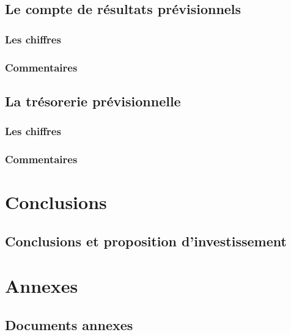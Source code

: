 \documentclass[a4paper]{report}
\begin{document}
\section{Le compte de résultats prévisionnels}

\subsection{Les chiffres}

\subsection{Commentaires}

\section{La trésorerie prévisionnelle}

\subsection{Les chiffres}

\subsection{Commentaires}

\chapter{Conclusions}

\section{Conclusions et proposition d'investissement}

\chapter{Annexes}

\section{Documents annexes}
\end{document}
